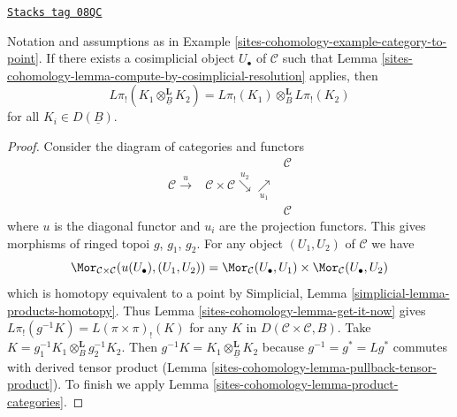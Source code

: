 \begin{lemma}
\label{sites-cohomology-lemma-eilenberg-zilber}
\href{https://stacks.math.columbia.edu/tag/08QC}{\texttt{Stacks tag 08QC}}

Notation and assumptions as in Example \ref{sites-cohomology-example-category-to-point}.
If there exists a cosimplicial object $U_\bullet$ of $\mathcal{C}$
such that Lemma \ref{sites-cohomology-lemma-compute-by-cosimplicial-resolution}
applies, then
$$
L\pi_!(K_1 \otimes^\mathbf{L}_{\underline{B}} K_2) =
L\pi_!(K_1) \otimes^\mathbf{L}_B L\pi_!(K_2)
$$
for all $K_i \in D(\underline{B})$.
\end{lemma}

\begin{proof}
Consider the diagram of categories and functors
$$
\begin{array}{ccc} &  & \mathcal{C} \\ \mathcal{C} \overset{u}{\longrightarrow} & \mathcal{C} \times \mathcal{C} \overset{u_2}{\searrow}\underset{u_1}{\nearrow} &  \\  &  & \mathcal{C}\end{array}
$$
where $u$ is the diagonal functor and $u_i$ are the projection functors.
This gives morphisms of ringed topoi $g$, $g_1$, $g_2$.
For any object $(U_1, U_2)$ of $\mathcal{C}$ we have
$$
\Mor_{\mathcal{C} \times \mathcal{C}}(u(U_\bullet), (U_1, U_2)) =
\Mor_\mathcal{C}(U_\bullet, U_1) \times \Mor_\mathcal{C}(U_\bullet, U_2)
$$
which is homotopy equivalent to a point by
Simplicial, Lemma \ref{simplicial-lemma-products-homotopy}.
Thus Lemma \ref{sites-cohomology-lemma-get-it-now} gives
$L\pi_!(g^{-1}K) = L(\pi \times \pi)_!(K)$ for any $K$ in
$D(\mathcal{C} \times \mathcal{C}, B)$.
Take $K = g_1^{-1}K_1 \otimes_B^\mathbf{L} g_2^{-1}K_2$.
Then $g^{-1}K = K_1 \otimes^\mathbf{L}_{\underline{B}} K_2$
because $g^{-1} = g^* = Lg^*$ commutes with derived tensor product
(Lemma \ref{sites-cohomology-lemma-pullback-tensor-product}).
To finish we apply Lemma \ref{sites-cohomology-lemma-product-categories}.
\end{proof}

